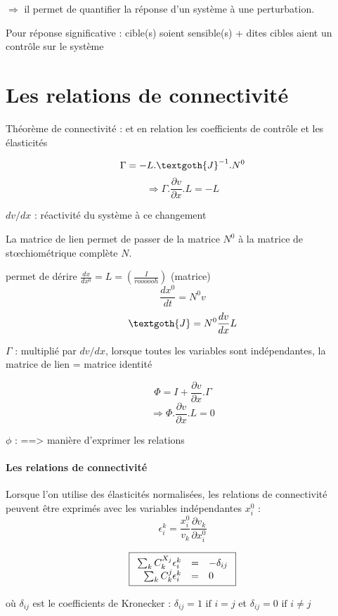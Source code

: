 $\Rightarrow$ il permet de quantifier la réponse d'un système à une perturbation.

Pour réponse significative : cible(s) soient sensible(s) + dites cibles aient un contrôle sur le système




\section{Les relations de connectivité}
Théorème de connectivité : et en relation les coefficients de contrôle et les élasticités

$$\Gamma = -L . \textgoth{J}^{-1}.N^0 $$
$$ \Rightarrow \Gamma . \frac{\partial v}{\partial x} . L = - L $$


$dv/dx$ : réactivité du système à ce changement

La matrice de lien permet de passer de la matrice $N^0$ à la matrice de stœchiométrique complète $N$.

permet de dérire $\frac{dx}{dx^0}= L= (\frac{I}{roooooh})$ (matrice)
	$$ \frac{dx^0}{dt}= N^0v $$
	$$ \textgoth{J} = N^0 \frac{dv}{dx}L $$

$\Gamma$ : multiplié par $dv/dx$, lorsque toutes les variables sont indépendantes, la matrice de lien = matrice identité


$$ \Phi = I + \frac{\partial v}{\partial x} . \Gamma $$
$$ \Rightarrow    \Phi . \frac{\partial v}{\partial x} . L = 0 $$


$\phi$ : 
==> manière d'exprimer les relations


\paragraph{Les relations de connectivité}
Lorsque l'on utilise des élasticités normalisées, les relations de connectivité peuvent être exprimés avec les variables indépendantes $x_i^0$ :
$$ \epsilon_i^k = \frac{x_i^0}{v_k} \frac{\partial v_k}{\partial x_i^0} $$

\begin{equation}
   \fbox{$
   \begin{array}{rcl}
      \sum_k C_k^{X_j} \epsilon_i^k & = & - \delta_{ij} \\
      \sum_k C_k^j \epsilon_i^k & = & 0
   \end{array}
   $}
\end{equation}

où $\delta_{ij}$ est le coefficients de Kronecker :  $\delta_{ij} = 1\text{ if } i  = j $
et $\delta_{ij} = 0 \text{ if }i  \neq  j $



